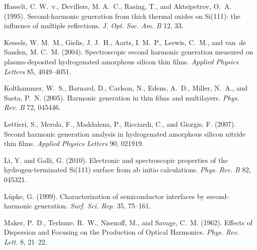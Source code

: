 \documentclass[utf8]{frontiersSCNS}
\begin{document}
\begin{thebibliography}{40}
Hasselt, C. W.~v., Devillers, M. A.~C., Rasing, T., and Aktsipetrov, O.~A.
  (1995).
\newblock Second-harmonic generation from thick thermal oxides on {Si}(111):
  the influence of multiple reflections.
\newblock \emph{J. Opt. Soc. Am. B} 12, 33.
\newblock {}

Kessels, W. M.~M., Gielis, J. J.~H., Aarts, I. M.~P., Leewis, C.~M., and van~de
  Sanden, M. C.~M. (2004).
\newblock Spectroscopic second harmonic generation measured on plasma-deposited
  hydrogenated amorphous silicon thin films.
\newblock \emph{Applied Physics Letters} 85, 4049--4051.
\newblock {}

Kolthammer, W.~S., Barnard, D., Carlson, N., Edens, A.~D., Miller, N.~A., and
  Saeta, P.~N. (2005).
\newblock Harmonic generation in thin films and multilayers.
\newblock \emph{Phys. Rev. B} 72, 045446.
\newblock {}

Lettieri, S., Merola, F., Maddalena, P., Ricciardi, C., and Giorgis, F. (2007).
\newblock Second harmonic generation analysis in hydrogenated amorphous silicon
  nitride thin films.
\newblock \emph{Applied Physics Letters} 90, 021919.
\newblock {}

Li, Y. and Galli, G. (2010).
\newblock Electronic and spectroscopic properties of the hydrogen-terminated
  {Si}(111) surface from ab initio calculations.
\newblock \emph{Phys. Rev. B} 82, 045321.
\newblock {}

L{\"u}pke, G. (1999).
\newblock Characterization of semiconductor interfaces by second-harmonic
  generation.
\newblock \emph{Surf. Sci. Rep.} 35, 75--161.
\newblock {}

Maker, P.~D., Terhune, R.~W., Nisenoff, M., and Savage, C.~M. (1962).
\newblock Effects of {Dispersion} and {Focusing} on the {Production} of
  {Optical} {Harmonics}.
\newblock \emph{Phys. Rev. Lett.} 8, 21--22.
\newblock {}


\end{thebibliography}
\end{document}
